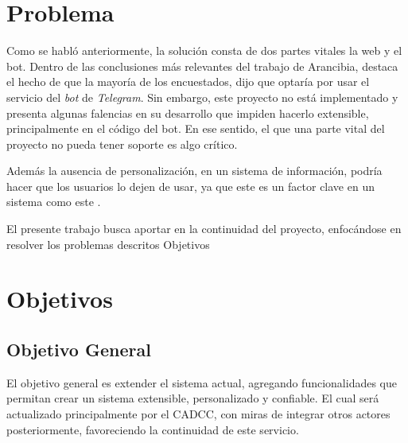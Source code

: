 \section{Problema}\label{sec:intro-pro}
    \par Como se habló anteriormente, la solución consta de dos partes vitales la web y el bot. Dentro de las conclusiones más relevantes del trabajo de Arancibia, destaca el hecho de que la mayoría de los encuestados, dijo que optaría por usar el servicio del \textit{bot} de \textit{Telegram}. Sin embargo, este proyecto no está implementado y presenta algunas falencias en su desarrollo que impiden hacerlo extensible, principalmente en el código del bot. En ese sentido, el que una parte vital del proyecto no pueda tener soporte es algo crítico. 
    \par Además la ausencia de personalización, en un sistema de información, podría hacer que los usuarios lo dejen de usar, ya que este es un factor clave en un sistema como este \cite{Paz2021}.
    \par El presente trabajo busca aportar en la continuidad del proyecto, enfocándose en resolver los problemas descritos Objetivos

\section{Objetivos}\label{sec:intro-obj}
  \subsection*{Objetivo General}\label{sec:obj-g}
       El objetivo general es extender el sistema actual, agregando funcionalidades que permitan crear un sistema extensible, personalizado y confiable. El cual será actualizado principalmente por el CADCC, con miras de integrar otros actores posteriormente, favoreciendo la continuidad de este servicio.
        
